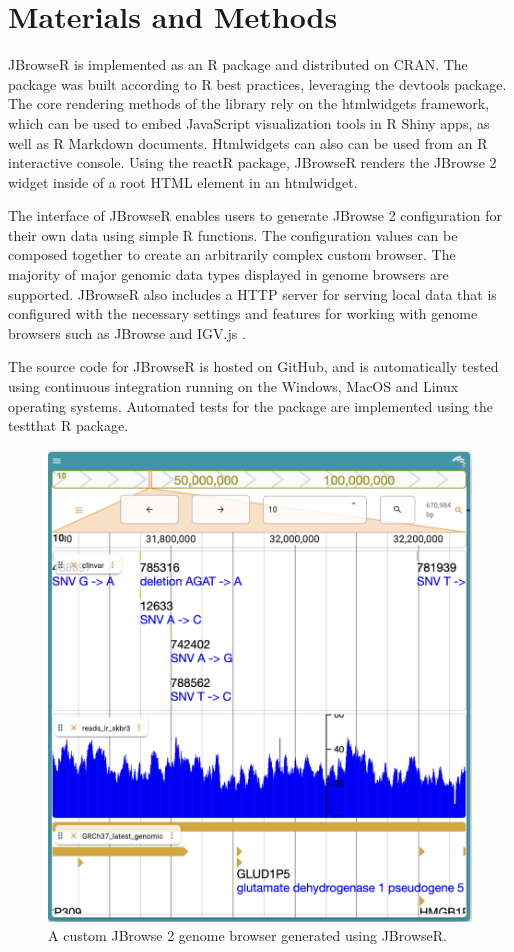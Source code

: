 \documentclass{bioinfo}
\begin{document}
\section{Materials and Methods}

JBrowseR is implemented as an R package and distributed on CRAN. The
package was built according to R best practices, leveraging the devtools
package. The core rendering methods of the library rely on the
htmlwidgets framework, which can be used to embed JavaScript
visualization tools in R Shiny apps, as well as R Markdown documents.
Htmlwidgets can also can be used from an R interactive console. Using
the reactR package, JBrowseR renders the JBrowse 2 widget inside of a
root HTML element in an htmlwidget.

The interface of JBrowseR enables users to generate JBrowse 2
configuration for their own data using simple R functions. The
configuration values can be composed together to create an arbitrarily
complex custom browser. The majority of major genomic data types
displayed in genome browsers are supported. JBrowseR also includes a
HTTP server for serving local data that is configured with the necessary
settings and features for working with genome browsers such as JBrowse
and IGV.js \citep{robinson2011integrative, robinson2017variant}.

The source code for JBrowseR is hosted on GitHub, and is automatically
tested using continuous integration running on the Windows, MacOS and
Linux operating systems. Automated tests for the package are implemented
using the testthat R package.

\begin{figure}
\includegraphics[width=1\linewidth]{JBrowseR-paper-fig1} \caption{A custom JBrowse 2 genome browser generated using JBrowseR.}\label{fig:unnamed-chunk-1}
\end{figure}
\end{document}
